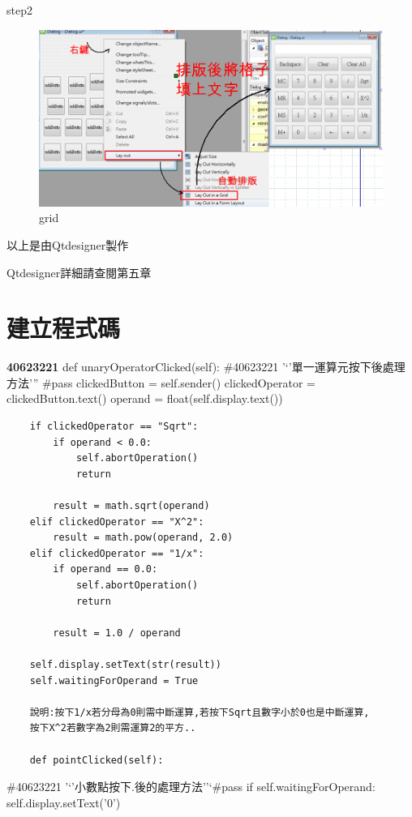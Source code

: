 \documentclass[12pt,,]{report}
\begin{document}
step2

\begin{figure}
\centering
\includegraphics{./tex2pdf.2656/5adf72ef7cc9374dcc293eda6ce7834a69361a58.png}
\caption{grid\label{fig:排版}}
\end{figure}

以上是由Qtdesigner製作

Qtdesigner詳細請查閱第五章

\hypertarget{ux5efaux7acbux7a0bux5f0fux78bc}{%
\section{建立程式碼}\label{ux5efaux7acbux7a0bux5f0fux78bc}}

\textbf{40623221} def unaryOperatorClicked(self): \#40623221
'`'單一運算元按下後處理方法''' \#pass clickedButton = self.sender()
clickedOperator = clickedButton.text() operand =
float(self.display.text())

\begin{verbatim}
    if clickedOperator == "Sqrt":
        if operand < 0.0:
            self.abortOperation()
            return

        result = math.sqrt(operand)
    elif clickedOperator == "X^2":
        result = math.pow(operand, 2.0)
    elif clickedOperator == "1/x":
        if operand == 0.0:
            self.abortOperation()
            return

        result = 1.0 / operand

    self.display.setText(str(result))
    self.waitingForOperand = True
    
    說明:按下1/x若分母為0則需中斷運算,若按下Sqrt且數字小於0也是中斷運算,
    按下X^2若數字為2則需運算2的平方..
    
    def pointClicked(self):
\end{verbatim}

\#40623221 '`'小數點按下.後的處理方法''`\#pass if
self.waitingForOperand: self.display.setText('0')
\end{document}
